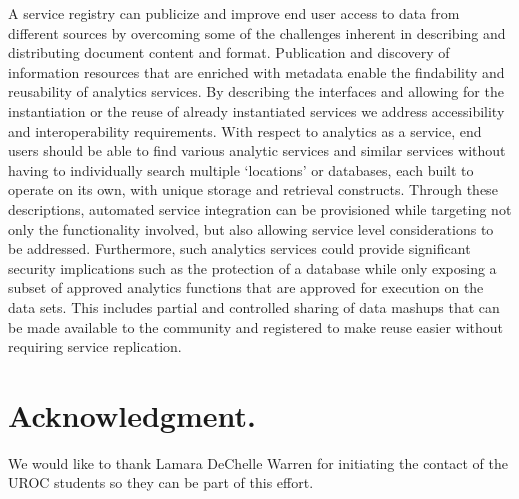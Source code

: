 \documentclass[A0,6pt]{article}
\begin{document}
\begin{multicols}{3}
A service registry can publicize and improve end user access to data from different sources by overcoming some of the challenges inherent in describing and distributing document content and format. Publication and discovery of information resources that are enriched with metadata enable the findability and reusability of analytics services. By describing the interfaces and allowing for the instantiation or the reuse of already instantiated services we address accessibility and interoperability requirements. With respect to analytics as a service, end users should be able to find various analytic services and similar services without having to individually search multiple ‘locations’ or databases, each built to operate on its own, with unique storage and retrieval constructs. Through these descriptions, automated service integration can be provisioned while targeting not only the functionality involved, but also allowing service level considerations to be addressed. Furthermore, such analytics services could provide significant security implications such as the protection of a database while only exposing a subset of approved analytics functions that are approved for execution on the data sets. This includes partial and controlled sharing of data mashups that can be made available to the community and registered to make reuse easier without requiring service replication.

{\tiny
\section*{\footnotesize Acknowledgment.}

We would like to thank Lamara DeChelle Warren for initiating the contact of the UROC students so they can be part of this effort. 



}


\end{multicols}
\end{document}
